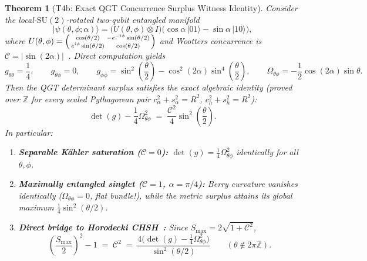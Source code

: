 \documentclass[11pt,reqno]{amsart}
\newtheorem{theorem}{Theorem}[section]
\theoremstyle{definition}
\newcommand{\Z}{\mathbb{Z}}
\newcommand{\Con}{\mathcal{C}}
\begin{document}
\begin{theorem}[T4b: Exact QGT Concurrence Surplus Witness Identity]
\label{thm:t4b}
Consider the local-$\mathrm{SU}(2)$-rotated two-qubit entangled manifold
\[
  |\psi(\theta,\phi;\alpha)\rangle = \bigl(U(\theta,\phi) \otimes I\bigr)\bigl(\cos\alpha\,|01\rangle - \sin\alpha\,|10\rangle\bigr),
\]
where $U(\theta,\phi) = \begin{psmallmatrix} \cos(\theta/2) & -e^{-i\phi}\sin(\theta/2) \\ e^{i\phi}\sin(\theta/2) & \cos(\theta/2) \end{psmallmatrix}$ and Wootters concurrence is $\Con = |\sin(2\alpha)|$~\cite{wootters1998}.
Direct computation yields
\[
  g_{\theta\theta} = \frac{1}{4}, \qquad g_{\theta\phi} = 0, \qquad g_{\phi\phi} = \sin^2\!\left(\frac{\theta}{2}\right) - \cos^2(2\alpha)\sin^4\!\left(\frac{\theta}{2}\right), \qquad \Omega_{\theta\phi} = -\frac{1}{2}\cos(2\alpha)\sin\theta.
\]
Then the QGT determinant surplus satisfies the \emph{exact algebraic identity} (proved over $\Z$ for every scaled Pythagorean pair $c_\alpha^2 + s_\alpha^2 = R^2$, $c_h^2 + s_h^2 = R^2$):
\begin{equation}
  \label{eq:qgt_surplus}
  \det(g) - \frac{1}{4}\Omega_{\theta\phi}^2 \;=\; \frac{\Con^2}{4}\sin^2\!\left(\frac{\theta}{2}\right).
\end{equation}
In particular:
\begin{enumerate}[leftmargin=1.8em]
  \item \textbf{Separable K\"ahler saturation ($\Con = 0$):} $\det(g) = \frac{1}{4}\Omega_{\theta\phi}^2$ identically for all $\theta, \phi$.
  \item \textbf{Maximally entangled singlet ($\Con = 1$, $\alpha = \pi/4$):} Berry curvature vanishes identically ($\Omega_{\theta\phi} = 0$, flat bundle!), while the metric surplus attains its global maximum $\frac{1}{4}\sin^2(\theta/2)$.
  \item \textbf{Direct bridge to Horodecki CHSH~\cite{horodecki1995}:} Since $S_{\max} = 2\sqrt{1 + \Con^2}$,
  \[
    \left(\frac{S_{\max}}{2}\right)^2 - 1 \;=\; \Con^2 \;=\; \frac{4\bigl(\det(g) - \frac{1}{4}\Omega_{\theta\phi}^2\bigr)}{\sin^2(\theta/2)} \qquad (\theta \notin 2\pi\Z).
  \]
\end{enumerate}
\end{theorem}
\end{document}
